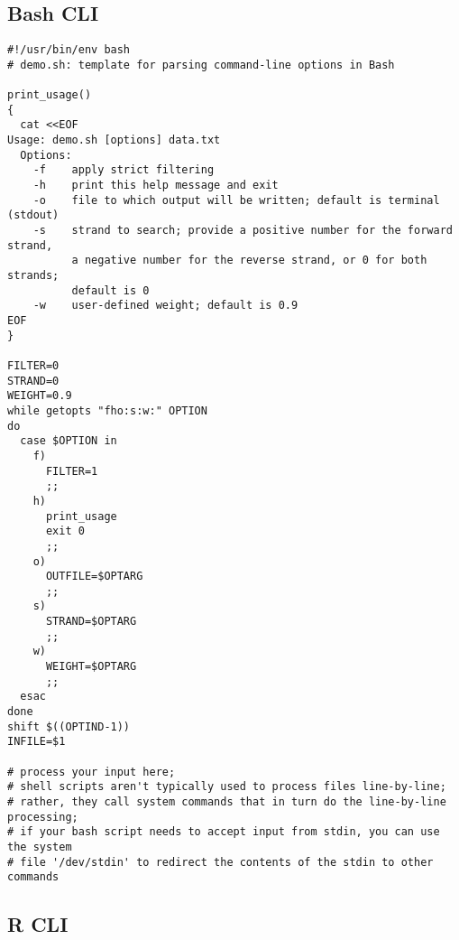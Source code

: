 \documentclass{article}
\begin{document}
\subsection{Bash CLI}

\begin{verbatim}
#!/usr/bin/env bash
# demo.sh: template for parsing command-line options in Bash

print_usage()
{
  cat <<EOF
Usage: demo.sh [options] data.txt
  Options:
    -f    apply strict filtering
    -h    print this help message and exit
    -o    file to which output will be written; default is terminal (stdout)
    -s    strand to search; provide a positive number for the forward strand,
          a negative number for the reverse strand, or 0 for both strands;
          default is 0
    -w    user-defined weight; default is 0.9
EOF
}

FILTER=0
STRAND=0
WEIGHT=0.9
while getopts "fho:s:w:" OPTION
do
  case $OPTION in
    f)
      FILTER=1
      ;;
    h)
      print_usage
      exit 0
      ;;
    o)
      OUTFILE=$OPTARG
      ;;
    s)
      STRAND=$OPTARG
      ;;
    w)
      WEIGHT=$OPTARG
      ;;
  esac
done
shift $((OPTIND-1))
INFILE=$1

# process your input here;
# shell scripts aren't typically used to process files line-by-line;
# rather, they call system commands that in turn do the line-by-line processing;
# if your bash script needs to accept input from stdin, you can use the system
# file '/dev/stdin' to redirect the contents of the stdin to other commands
\end{verbatim}

\subsection{R CLI}
\end{document}
